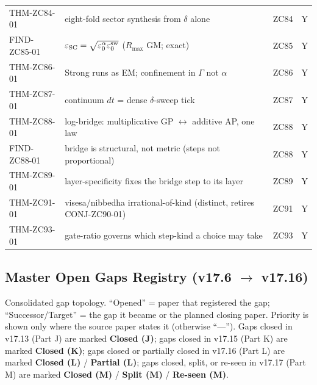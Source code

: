 \documentclass[11pt, a4paper]{article}
\begin{document}
{\begin{longtable}{p{2.7cm} p{7.6cm} p{2.0cm} c}
THM-ZC84-01 & eight-fold sector synthesis from $\delta$ alone & ZC84 & Y \\
FIND-ZC85-01 & $\varepsilon_{\rm SC}=\sqrt{\varepsilon_0^{\alpha}\varepsilon_0^{\rm sw}}$ ($R_{\max}$ GM; exact) & ZC85 & Y \\
THM-ZC86-01 & Strong runs as EM; confinement in $\Gamma$ not $\alpha$ & ZC86 & Y \\
THM-ZC87-01 & continuum $dt$ = dense $\delta$-sweep tick & ZC87 & Y \\
THM-ZC88-01 & log-bridge: multiplicative GP $\leftrightarrow$ additive AP, one law & ZC88 & Y \\
FIND-ZC88-01 & bridge is structural, not metric (steps not proportional) & ZC88 & Y \\
THM-ZC89-01 & layer-specificity fixes the bridge step to its layer & ZC89 & Y \\
THM-ZC91-01 & visesa/nibbedha irrational-of-kind (distinct, retires CONJ-ZC90-01) & ZC91 & Y \\
THM-ZC93-01 & gate-ratio governs which step-kind a choice may take & ZC93 & Y \\
\bottomrule
\end{longtable}
}

\subsection*{Master Open Gaps Registry (v17.6 $\to$ v17.16)}

Consolidated gap topology. ``Opened'' = paper that registered the gap;
``Successor/Target'' = the gap it became or the planned closing paper.
Priority is shown only where the source paper states it (otherwise
``---''). Gaps closed in v17.13 (Part J) are marked \textbf{Closed (J)};
gaps closed in v17.15 (Part K) are marked \textbf{Closed (K)};
gaps closed or partially closed in v17.16 (Part L) are marked
\textbf{Closed (L)} / \textbf{Partial (L)}; gaps closed, split, or
re-seen in v17.17 (Part M) are marked \textbf{Closed (M)} /
\textbf{Split (M)} / \textbf{Re-seen (M)}.
\end{document}
